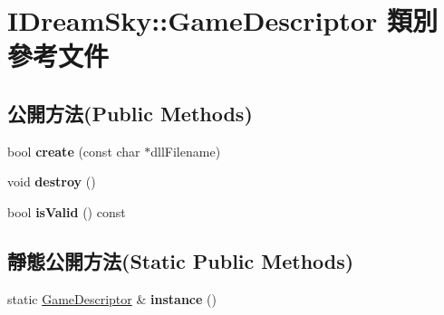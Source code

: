 \hypertarget{class_i_dream_sky_1_1_game_descriptor}{}\section{I\+Dream\+Sky\+:\+:Game\+Descriptor 類別 參考文件}
\label{class_i_dream_sky_1_1_game_descriptor}
\subsection*{公開方法(Public Methods)}
\begin{DoxyCompactItemize}
\item 
bool {\bfseries create} (const char $\ast$dll\+Filename)\hypertarget{class_i_dream_sky_1_1_game_descriptor_ab4db357cbaf7c45d808a20bea9ae7d3f}{}\label{class_i_dream_sky_1_1_game_descriptor_ab4db357cbaf7c45d808a20bea9ae7d3f}

\item 
void {\bfseries destroy} ()\hypertarget{class_i_dream_sky_1_1_game_descriptor_aca3743d0c876e8cbd42d6a892694c7cd}{}\label{class_i_dream_sky_1_1_game_descriptor_aca3743d0c876e8cbd42d6a892694c7cd}

\item 
bool {\bfseries is\+Valid} () const \hypertarget{class_i_dream_sky_1_1_game_descriptor_a1d2cefc8a25aedda51f96cb943ec8a25}{}\label{class_i_dream_sky_1_1_game_descriptor_a1d2cefc8a25aedda51f96cb943ec8a25}

\end{DoxyCompactItemize}
\subsection*{靜態公開方法(Static Public Methods)}
\begin{DoxyCompactItemize}
\item 
static \hyperlink{class_i_dream_sky_1_1_game_descriptor}{Game\+Descriptor} \& {\bfseries instance} ()\hypertarget{class_i_dream_sky_1_1_game_descriptor_a44fc91aa03a9684659b0051372c4ff16}{}\label{class_i_dream_sky_1_1_game_descriptor_a44fc91aa03a9684659b0051372c4ff16}

\end{DoxyCompactItemize}
